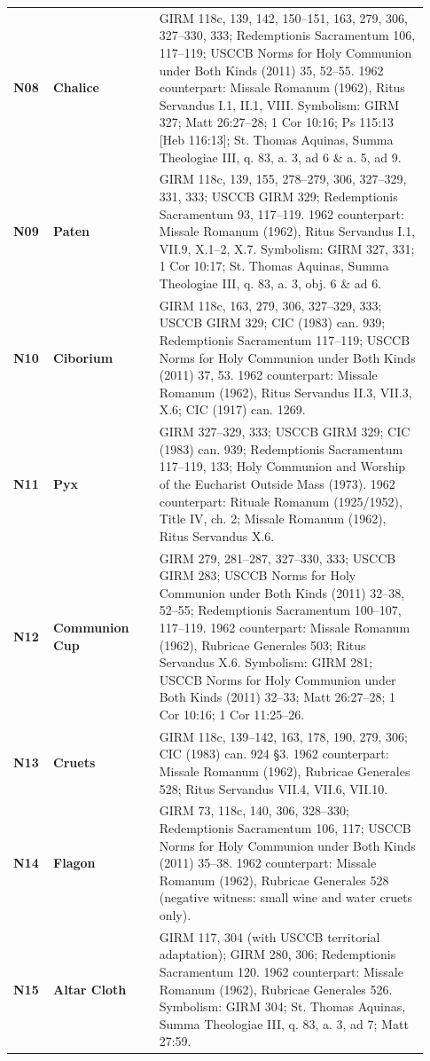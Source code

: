 {\begin{longtable}{>{\raggedright\arraybackslash}p{0.08\linewidth}>{\raggedright\arraybackslash}p{0.24\linewidth}>{\raggedright\arraybackslash}p{0.61\linewidth}}
\textbf{N08} & \textbf{Chalice} & GIRM 118c, 139, 142, 150--151, 163, 279, 306, 327--330, 333; Redemptionis Sacramentum 106, 117--119; USCCB Norms for Holy Communion under Both Kinds (2011) 35, 52--55. 1962 counterpart: Missale Romanum (1962), Ritus Servandus I.1, II.1, VIII. Symbolism: GIRM 327; Matt 26:27--28; 1 Cor 10:16; Ps 115:13 [Heb 116:13]; St. Thomas Aquinas, Summa Theologiae III, q. 83, a. 3, ad 6 \& a. 5, ad 9. \\
\textbf{N09} & \textbf{Paten} & GIRM 118c, 139, 155, 278--279, 306, 327--329, 331, 333; USCCB GIRM 329; Redemptionis Sacramentum 93, 117--119. 1962 counterpart: Missale Romanum (1962), Ritus Servandus I.1, VII.9, X.1--2, X.7. Symbolism: GIRM 327, 331; 1 Cor 10:17; St. Thomas Aquinas, Summa Theologiae III, q. 83, a. 3, obj. 6 \& ad 6. \\
\textbf{N10} & \textbf{Ciborium} & GIRM 118c, 163, 279, 306, 327--329, 333; USCCB GIRM 329; CIC (1983) can. 939; Redemptionis Sacramentum 117--119; USCCB Norms for Holy Communion under Both Kinds (2011) 37, 53. 1962 counterpart: Missale Romanum (1962), Ritus Servandus II.3, VII.3, X.6; CIC (1917) can. 1269. \\
\textbf{N11} & \textbf{Pyx} & GIRM 327--329, 333; USCCB GIRM 329; CIC (1983) can. 939; Redemptionis Sacramentum 117--119, 133; Holy Communion and Worship of the Eucharist Outside Mass (1973). 1962 counterpart: Rituale Romanum (1925/1952), Title IV, ch. 2; Missale Romanum (1962), Ritus Servandus X.6. \\
\textbf{N12} & \textbf{Communion Cup} & GIRM 279, 281--287, 327--330, 333; USCCB GIRM 283; USCCB Norms for Holy Communion under Both Kinds (2011) 32--38, 52--55; Redemptionis Sacramentum 100--107, 117--119. 1962 counterpart: Missale Romanum (1962), Rubricae Generales 503; Ritus Servandus X.6. Symbolism: GIRM 281; USCCB Norms for Holy Communion under Both Kinds (2011) 32--33; Matt 26:27--28; 1 Cor 10:16; 1 Cor 11:25--26. \\
\textbf{N13} & \textbf{Cruets} & GIRM 118c, 139--142, 163, 178, 190, 279, 306; CIC (1983) can. 924 §3. 1962 counterpart: Missale Romanum (1962), Rubricae Generales 528; Ritus Servandus VII.4, VII.6, VII.10. \\
\textbf{N14} & \textbf{Flagon} & GIRM 73, 118c, 140, 306, 328--330; Redemptionis Sacramentum 106, 117; USCCB Norms for Holy Communion under Both Kinds (2011) 35--38. 1962 counterpart: Missale Romanum (1962), Rubricae Generales 528 (negative witness: small wine and water cruets only). \\
\textbf{N15} & \textbf{Altar Cloth} & GIRM 117, 304 (with USCCB territorial adaptation); GIRM 280, 306; Redemptionis Sacramentum 120. 1962 counterpart: Missale Romanum (1962), Rubricae Generales 526. Symbolism: GIRM 304; St. Thomas Aquinas, Summa Theologiae III, q. 83, a. 3, ad 7; Matt 27:59. \\

\end{longtable}}
